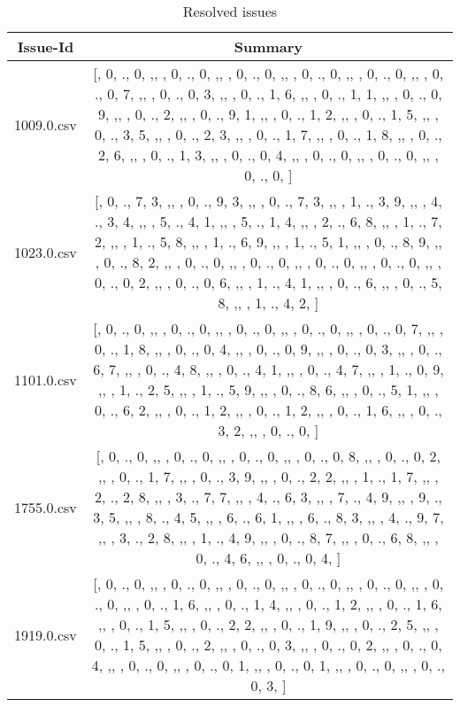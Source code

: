 \begin{table}[ht]
\caption{Resolved issues}
\centering
\begin{tabular}{@{}c c@{}}
	\toprule
	{\bfseries Issue-Id} & {\bfseries Summary} \\
	\midrule
	1009.0.csv & [, 0, ., 0, ,,  , 0, ., 0, ,,  , 0, ., 0, ,,  , 0, ., 0, ,,  , 0, ., 0, ,,  , 0, ., 0, 7, ,,  , 0, ., 0, 3, ,,  , 0, ., 1, 6, ,,  , 0, ., 1, 1, ,,  , 0, ., 0, 9, ,,  , 0, ., 2, ,,  , 0, ., 9, 1, ,,  , 0, ., 1, 2, ,,  , 0, ., 1, 5, ,,  , 0, ., 3, 5, ,,  , 0, ., 2, 3, ,,  , 0, ., 1, 7, ,,  , 0, ., 1, 8, ,,  , 0, ., 2, 6, ,,  , 0, ., 1, 3, ,,  , 0, ., 0, 4, ,,  , 0, ., 0, ,,  , 0, ., 0, ,,  , 0, ., 0, ]\\ 
	1023.0.csv & [, 0, ., 7, 3, ,,  , 0, ., 9, 3, ,,  , 0, ., 7, 3, ,,  , 1, ., 3, 9, ,,  , 4, ., 3, 4, ,,  , 5, ., 4, 1, ,,  , 5, ., 1, 4, ,,  , 2, ., 6, 8, ,,  , 1, ., 7, 2, ,,  , 1, ., 5, 8, ,,  , 1, ., 6, 9, ,,  , 1, ., 5, 1, ,,  , 0, ., 8, 9, ,,  , 0, ., 8, 2, ,,  , 0, ., 0, ,,  , 0, ., 0, ,,  , 0, ., 0, ,,  , 0, ., 0, ,,  , 0, ., 0, 2, ,,  , 0, ., 0, 6, ,,  , 1, ., 4, 1, ,,  , 0, ., 6, ,,  , 0, ., 5, 8, ,,  , 1, ., 4, 2, ]\\ 
	1101.0.csv & [, 0, ., 0, ,,  , 0, ., 0, ,,  , 0, ., 0, ,,  , 0, ., 0, ,,  , 0, ., 0, 7, ,,  , 0, ., 1, 8, ,,  , 0, ., 0, 4, ,,  , 0, ., 0, 9, ,,  , 0, ., 0, 3, ,,  , 0, ., 6, 7, ,,  , 0, ., 4, 8, ,,  , 0, ., 4, 1, ,,  , 0, ., 4, 7, ,,  , 1, ., 0, 9, ,,  , 1, ., 2, 5, ,,  , 1, ., 5, 9, ,,  , 0, ., 8, 6, ,,  , 0, ., 5, 1, ,,  , 0, ., 6, 2, ,,  , 0, ., 1, 2, ,,  , 0, ., 1, 2, ,,  , 0, ., 1, 6, ,,  , 0, ., 3, 2, ,,  , 0, ., 0, ]\\ 
	1755.0.csv & [, 0, ., 0, ,,  , 0, ., 0, ,,  , 0, ., 0, ,,  , 0, ., 0, 8, ,,  , 0, ., 0, 2, ,,  , 0, ., 1, 7, ,,  , 0, ., 3, 9, ,,  , 0, ., 2, 2, ,,  , 1, ., 1, 7, ,,  , 2, ., 2, 8, ,,  , 3, ., 7, 7, ,,  , 4, ., 6, 3, ,,  , 7, ., 4, 9, ,,  , 9, ., 3, 5, ,,  , 8, ., 4, 5, ,,  , 6, ., 6, 1, ,,  , 6, ., 8, 3, ,,  , 4, ., 9, 7, ,,  , 3, ., 2, 8, ,,  , 1, ., 4, 9, ,,  , 0, ., 8, 7, ,,  , 0, ., 6, 8, ,,  , 0, ., 4, 6, ,,  , 0, ., 0, 4, ]\\ 
	1919.0.csv & [, 0, ., 0, ,,  , 0, ., 0, ,,  , 0, ., 0, ,,  , 0, ., 0, ,,  , 0, ., 0, ,,  , 0, ., 0, ,,  , 0, ., 1, 6, ,,  , 0, ., 1, 4, ,,  , 0, ., 1, 2, ,,  , 0, ., 1, 6, ,,  , 0, ., 1, 5, ,,  , 0, ., 2, 2, ,,  , 0, ., 1, 9, ,,  , 0, ., 2, 5, ,,  , 0, ., 1, 5, ,,  , 0, ., 2, ,,  , 0, ., 0, 3, ,,  , 0, ., 0, 2, ,,  , 0, ., 0, 4, ,,  , 0, ., 0, ,,  , 0, ., 0, 1, ,,  , 0, ., 0, 1, ,,  , 0, ., 0, ,,  , 0, ., 0, 3, ]\\ 

\end{tabular}
\end{table}
